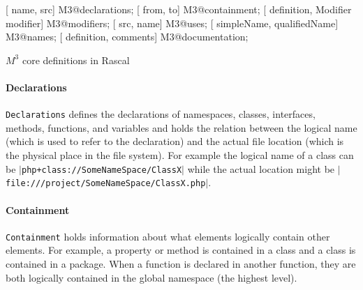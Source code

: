 \documentclass[../main.tex]{subfiles}
\begin{document}
    \begin{program}    
    \begin{rascal}%
 [ name,  src] M3@declarations; 
 [ from,  to] M3@containment; 
 [ definition, Modifier modifier] M3@modifiers; 
 [ src,  name] M3@uses; 
 [ simpleName,  qualifiedName] M3@names; 
 [ definition,  comments] M3@documentation; \end{rascal}%
	
	\caption{$M^3$ core definitions in Rascal}
	\label{fig:m3_core_elements}
	\end{program}
	    
    \paragraph{Declarations} \texttt{Declarations} defines the declarations of namespaces, classes, interfaces, methods, functions, and variables and holds the relation between the logical name (which is used to refer to the declaration) and the actual file location (which is the physical place in the file system).
    For example the logical name of a class can be \texttt{$\vert$php+class://SomeNameSpace/ClassX$\vert$} while the actual location might be \texttt{$\vert$file:///project/SomeNameSpace/ClassX.php$\vert$}.
    
    \paragraph{Containment} \texttt{Containment} holds information about what elements logically contain other elements.
    For example, a property or method is contained in a class and a class is contained in a package.
    When a function is declared in another function, they are both logically contained in the global namespace (the highest level).
    
\end{document}
